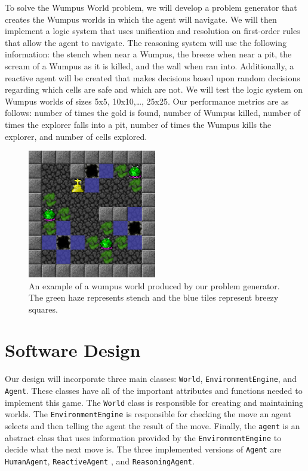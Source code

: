 \documentclass{article}
\begin{document}
		To solve the Wumpus World problem, we will develop a problem generator that creates the Wumpus worlds in which the agent will navigate.  We will then implement a logic system that uses unification and resolution on first-order rules that allow the agent to navigate.  The reasoning system will use the following information: the stench when near a Wumpus, the breeze when near a pit, the scream of a Wumpus as it is killed, and the wall when ran into.  Additionally, a reactive agent will be created that makes decisions based upon random decisions regarding which cells are safe and which are not.  We will test the logic system on Wumpus worlds of sizes {5x5, 10x10,…, 25x25}.  Our performance metrics are as follows: number of times the gold is found, number of Wumpus killed, number of times the explorer falls into a pit, number of times the Wumpus kills the explorer, and number of cells explored.
		
		\begin{figure}
			\centering
			\includegraphics[width=0.5\textwidth]{images/ex_ww}
			\caption{An example of a wumpus world produced by our problem generator. The green haze represents stench and the blue tiles represent breezy squares.}
			\label{ex_ww}
		\end{figure}

	
	\section{Software Design}
		Our design will incorporate three main classes: \texttt{World}, \texttt{EnvironmentEngine}, and \texttt{Agent}. 
		These classes have all of the important attributes and functions needed to implement this game.
		The \texttt{World} class is responsible for creating and maintaining worlds.
		The \texttt{EnvironmentEngine} is responsible for checking the move an agent selects and then telling the agent the result of the move.
		Finally, the \texttt{agent} is an abstract class that uses information provided by the \texttt{EnvironmentEngine} to decide what the next move is. The three implemented versions of \texttt{Agent} are \texttt{HumanAgent}, \texttt{ReactiveAgent} , and \texttt{ReasoningAgent}.
		
\end{document}
